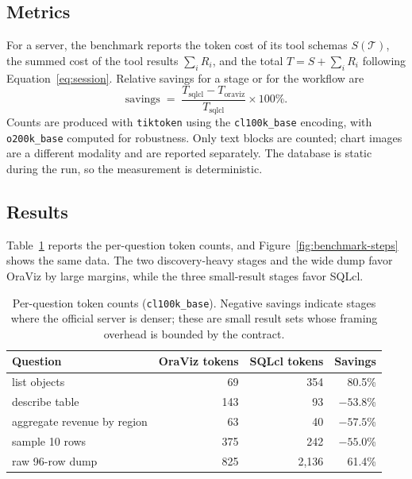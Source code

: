 \subsection{Metrics}

For a server, the benchmark reports the token cost of its tool schemas $S(\mathcal{T})$, the summed cost of the tool results $\sum_i R_i$, and the total $T = S + \sum_i R_i$ following Equation~\ref{eq:session}. Relative savings for a stage or for the workflow are
\begin{equation}
\text{savings} \;=\; \frac{T_{\text{sqlcl}} - T_{\text{oraviz}}}{T_{\text{sqlcl}}} \times 100\% .
\label{eq:savings}
\end{equation}
Counts are produced with \texttt{tiktoken} \cite{tiktoken2024} using the \texttt{cl100k\_base} encoding, with \texttt{o200k\_base} computed for robustness. Only text blocks are counted; chart images are a different modality and are reported separately. The database is static during the run, so the measurement is deterministic.

\subsection{Results}

Table~\ref{tab:steps} reports the per-question token counts, and Figure~\ref{fig:benchmark-steps} shows the same data. The two discovery-heavy stages and the wide dump favor OraViz by large margins, while the three small-result stages favor SQLcl.

\begin{table}[t]
\centering
\small
\begin{tabular}{lrrr}
\toprule
Question & OraViz tokens & SQLcl tokens & Savings \\
\midrule
list objects & 69 & 354 & 80.5\% \\
describe table & 143 & 93 & $-53.8$\% \\
aggregate revenue by region & 63 & 40 & $-57.5$\% \\
sample 10 rows & 375 & 242 & $-55.0$\% \\
raw 96-row dump & 825 & 2{,}136 & 61.4\% \\
\bottomrule
\end{tabular}
\caption{Per-question token counts (\texttt{cl100k\_base}). Negative savings indicate stages where the official server is denser; these are small result sets whose framing overhead is bounded by the contract.}
\label{tab:steps}
\end{table}

